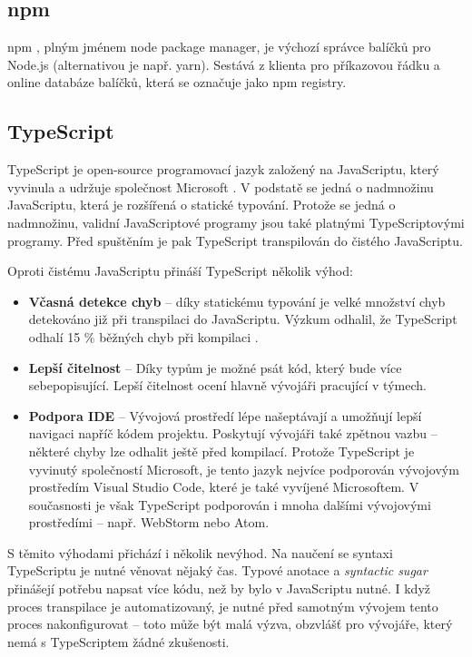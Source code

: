 \documentclass[thesis=M,czech]{FITthesis}[2019/12/23]
\begin{document}
\subsection{npm}
npm \cite{npm}, plným jménem node package manager, je výchozí správce balíčků pro Node.js (alternativou je např. yarn\cite{yarn}). Sestává z klienta pro příkazovou řádku a online databáze balíčků, která se označuje jako npm registry.

\subsection{TypeScript}
TypeScript je open-source programovací jazyk založený na JavaScriptu, který vyvinula a udržuje společnost Microsoft \cite{typescript_2015}. V podstatě se jedná o nadmnožinu JavaScriptu, která je rozšířená o statické typování. Protože se jedná o nadmnožinu, validní JavaScriptové programy jsou také platnými TypeScriptovými programy. Před spuštěním je pak TypeScript transpilován do čistého JavaScriptu.

Oproti čistému JavaScriptu přináší TypeScript několik výhod:

\begin{itemize}
  \item \textbf{Včasná detekce chyb} -- díky statickému typování je velké množství chyb detekováno již při transpilaci do JavaScriptu. Výzkum odhalil, že TypeScript odhalí 15 \% běžných chyb při kompilaci \cite{typescript_bugs}.
  \item \textbf{Lepší čitelnost} -- Díky typům je možné psát kód, který bude více sebepopisující. Lepší čitelnost ocení hlavně vývojáři pracující v týmech.
  \item \textbf{Podpora IDE} -- Vývojová prostředí lépe našeptávají a umožňují lepší navigaci napříč kódem projektu. Poskytují vývojáři také zpětnou vazbu -- některé chyby lze odhalit ještě před kompilací. Protože TypeScript je vyvinutý společností Microsoft, je tento jazyk nejvíce podporován vývojovým prostředím Visual Studio Code, které je také vyvíjené Microsoftem. V současnosti je však TypeScript podporován i mnoha dalšími vývojovými prostředími -- např. WebStorm nebo Atom.
\end{itemize}

S těmito výhodami přichází i několik nevýhod. Na naučení se syntaxi TypeScriptu je nutné věnovat nějaký čas. Typové anotace a \textit{syntactic sugar} přinášejí potřebu napsat více kódu, než by bylo v JavaScriptu nutné. I když proces transpilace je automatizovaný, je nutné před samotným vývojem tento proces nakonfigurovat -- toto může být malá výzva, obzvlášť pro vývojáře, který nemá s TypeScriptem žádné zkušenosti.
\end{document}
